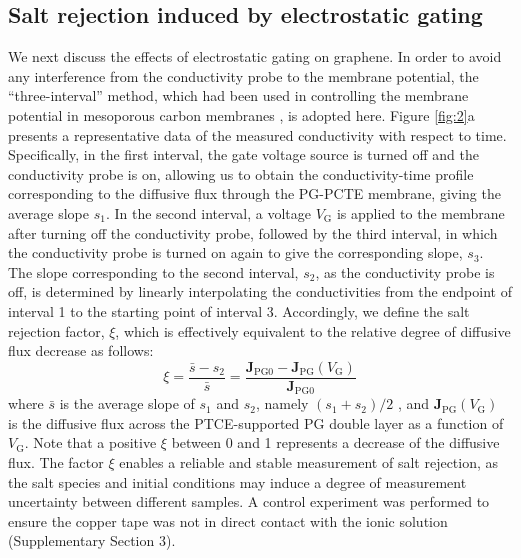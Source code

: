 \documentclass[manuscript=letter, email=true, hyperref=true, keywords=false]{achemso}
\begin{document}
\subsection{Salt rejection induced by electrostatic gating}
\label{sec:res-2}

We next discuss the effects of electrostatic gating on graphene. In
order to avoid any interference from the conductivity probe to the
membrane potential, the “three-interval” method, which had been used
in controlling the membrane potential in mesoporous carbon membranes
, is adopted here. Figure \ref{fig:2}a presents a
representative data of the measured conductivity with respect to
time. Specifically, in the first interval, the gate voltage source is
turned off and the conductivity probe is on, allowing us to obtain the
conductivity-time profile corresponding to the diffusive flux through
the PG-PCTE membrane, giving the average slope $s_{1}$. In the second
interval, a voltage $V_{\mathrm{G}}$ is applied to the membrane after
turning off the conductivity probe, followed by the third interval, in
which the conductivity probe is turned on again to give the
corresponding slope, $s_{3}$. The slope corresponding to the second
interval, $s_{2}$, as the conductivity probe is off, is determined by
linearly interpolating the conductivities from the endpoint of
interval 1 to the starting point of interval 3. Accordingly, we define
the salt rejection factor, $\xi$, which is effectively equivalent to
the relative degree of diffusive flux decrease as follows:
\begin{equation}
  \label{eq:rejection}
  \xi = \frac{\bar{s} - s_{2}}{\bar{s}} = \frac{\boldsymbol{J}_{\mathrm{PG0}}
    - \boldsymbol{J}_{\mathrm{PG}}(V_{\mathrm{G}})}{\boldsymbol{J}_{\mathrm{PG0}}}
\end{equation}
where $\bar{s}$ is the average slope of $s_{1}$ and $s_{2}$, namely
$(s_{1} + s_{2})/2$ ,
and $\boldsymbol{J}_{\mathrm{PG}}(V_{\mathrm{G}})$ is the diffusive
flux across the PTCE-supported PG double layer as a function of
$V_{\mathrm{G}}$. Note that a positive $\xi$ between 0 and 1
represents a decrease of the diffusive flux. The factor $\xi$ enables a
reliable and stable measurement of salt rejection, as the salt species
and initial conditions may induce a degree of measurement uncertainty
between different samples. A control experiment was performed to
ensure the copper tape was not in direct contact with the ionic
solution (Supplementary Section 3).
\end{document}
